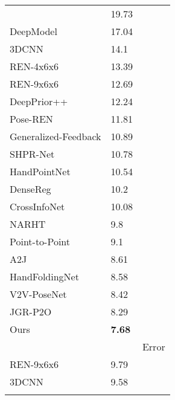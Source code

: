 \documentclass{article}
\begin{document}
\begin{table}
\begin{tabularx}{\columnwidth}{lll}
{\begin{tabular}{cr}
\hline
         DeepPrior \cite{oberweger2015hands}          &        19.73 \\
            DeepModel \cite{zhou2016model}            &        17.04 \\
                3DCNN \cite{ge20173d}                 &        14.1  \\
            REN-4x6x6 \cite{guo2017region}            &        13.39 \\
           REN-9x6x6 \cite{wang2018region}            &        12.69 \\
     DeepPrior++ \cite{oberweger2017deepprior++}      &        12.24 \\
             Pose-REN \cite{chen2020pose}             &        11.81 \\
 Generalized-Feedback \cite{oberweger2019generalized} &        10.89 \\
             SHPR-Net \cite{chen2018shpr}             &        10.78 \\
            HandPointNet \cite{ge2018hand}            &        10.54 \\
             DenseReg \cite{wan2018dense}             &        10.2  \\
        CrossInfoNet \cite{du2019crossinfonet}        &        10.08 \\
              NARHT \cite{huang2020hand}              &         9.8  \\
          Point-to-Point \cite{ge2018point}           &         9.1  \\
               A2J \cite{xiong2019a2j}                &         8.61 \\
    HandFoldingNet \cite{cheng2021handfoldingnet}     &         8.58 \\
            V2V-PoseNet \cite{moon2018v2v}            &         8.42 \\
              JGR-P2O \cite{fang2020jgr}              &         8.29 \\
               Ours                                   &        \textbf{7.68} \\
\hline
\end{tabular}}
&
\resizebox{3cm}{!}{
    \begin{tabular}{cr}
\hline
                    Methods                    &   Error  \\
\hline
        REN-9x6x6 \cite{wang2018region}        &         9.79 \\
             3DCNN \cite{ge20173d}             &         9.58 \\

\end{tabular}}
\end{tabularx}
\end{table}
\end{document}

